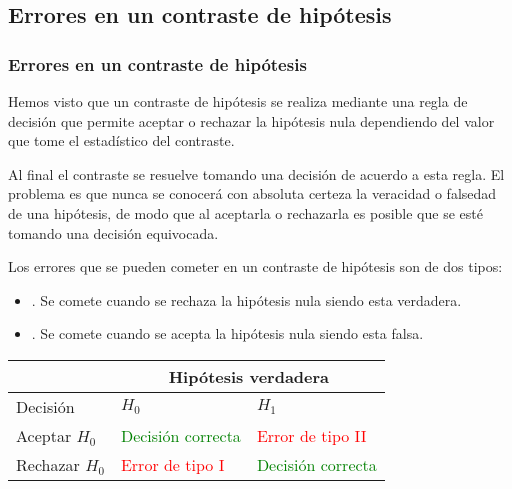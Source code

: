 \subsection{Errores en un contraste de hipótesis}
\begin{frame}
\frametitle{Errores en un contraste de hipótesis}
Hemos visto que un contraste de hipótesis se realiza mediante una regla de decisión que permite aceptar o rechazar la hipótesis nula dependiendo del valor que tome el estadístico del contraste.

Al final el contraste se resuelve tomando una decisión de acuerdo a esta regla.
El problema es que nunca se conocerá con absoluta certeza la veracidad o falsedad de una hipótesis, de modo que al aceptarla o rechazarla es posible que se esté tomando una decisión equivocada.

Los errores que se pueden cometer en un contraste de hipótesis son de dos tipos:
\begin{itemize}
\item {}. Se comete cuando se rechaza la hipótesis nula siendo esta verdadera.
\item {}. Se comete cuando se acepta la hipótesis nula siendo esta falsa.
\end{itemize}
\begin{center}
\smallsize
\begin{tabular}{|m{2.2cm}<{\centering}|m{4cm}<{\centering}|m{4cm}<{\centering}|}
\cline{2-3}
\multicolumn{1}{c|}{} & \multicolumn{2}{|c|}{Hipótesis verdadera}\\
\hline
Decisión & $H_0$ & $H_1$\\ \hline
Aceptar $H_0$ & \textcolor{green}{Decisión correcta} & \textcolor{red}{Error de tipo II}\\
\hline
Rechazar $H_0$ & \textcolor{red}{Error de tipo I} & \textcolor{green}{Decisión correcta}\\
\hline
\end{tabular}
\end{center}
\end{frame}


